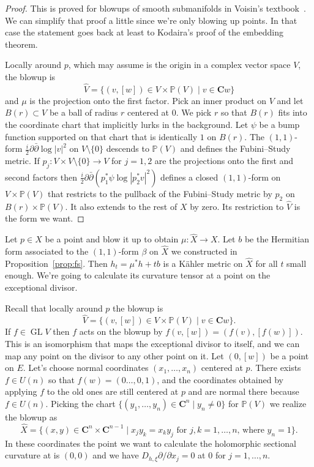 \documentclass[10pt,a4paper]{amsart}
\newcommand{\kk}[1]{\mathbb{#1}}
\def\CC{\mathbf{C}}
\def\fs{b}
\DeclareMathOperator{\GL}{GL}
\def\hsc{holomorphic sectional curvature}
\def\bl#1{\widehat{#1}}
\begin{document}
\begin{proof}
This is proved for blowups of smooth submanifolds in
Voisin's textbook~\cite{voisin2002theorie}.
We can simplify that proof a little since we're only blowing up points.
In that case the statement goes back at least to Kodaira's proof of the
embedding theorem.


Locally around $p$, which may assume is the origin in a complex vector space
$V$, the blowup is
$$
\bl V
= \{ (v,[w]) \in V \times \kk P(V) \mid v \in \CC w \}
$$
and $\mu$ is the projection onto the first factor.
Pick an inner product on $V$ and let $B(r) \subset V$ be a ball of radius $r$
centered at $0$.
We pick $r$ so that $B(r)$ fits into the coordinate chart that implicitly lurks
in the background.
Let $\psi$ be a bump function supported on that chart that is identically $1$
on $B(r)$.
The $(1,1)$-form $\frac i2 \partial\bar\partial \log |v|^2$ on $V \setminus
\{0\}$ descends to $\kk P(V)$ and defines the Fubini--Study metric.
If $p_j : V \times V \setminus \{0\} \to V$ for $j = 1,2$ are the projections
onto the first and second factors then
$\frac i2 \partial \bar\partial (p_1^*\psi \log |p_2^*v|^2)$
defines a closed $(1,1)$-form on $V \times \kk P(V)$ that restricts to the
pullback of the Fubini--Study metric by $p_2$ on $B(r) \times \kk P(V)$.
It also extends to the rest of $X$ by zero.
Its restriction to $\bl V$ is the form we want.
\end{proof}




Let $p \in X$ be a point and blow it up to obtain $\mu : \bl X \to X$.
Let $\fs$ be the Hermitian form associated to the $(1,1)$-form $\beta$ on $\bl X$
we constructed in Proposition~\ref{prop:fs}.
Then $h_t = \mu^*h + t \fs$ is a K\"ahler metric on $\bl X$ for all $t$ small
enough.
We're going to calculate its curvature tensor at a point on the exceptional
divisor.

Recall that locally around $p$ the blowup is
$$
\bl V
= \{ (v,[w]) \in V \times \kk P(V) \mid v \in \CC w \}.
$$
If $f \in \GL V$ then $f$ acts on the blowup by $f(v, [w]) = (f(v), [f(w)])$.
This is an isomorphism that maps the exceptional divisor to itself, and we can
map any point on the divisor to any other point on it.
Let $(0, [w])$ be a point on $E$.
Let's choose normal coordinates $(x_1,\ldots,x_n)$ centered at $p$.
There exists $f \in U(n)$ so that $f(w) = (0 \ldots, 0, 1)$, and the
coordinates obtained by applying $f$ to the old ones are still centered at $p$
and are normal there because $f \in U(n)$.
Picking the chart $\{(y_1, \ldots, y_n) \in \CC^n \mid y_n \not= 0 \}$ for
$\kk P(V)$
we realize the blowup as
$$
\bl X
= \{ (x,y) \in \CC^n \times \CC^{n-1}
\mid x_j y_k = x_k y_j \text{ for $j,k = 1,\ldots,n$, where $y_n = 1$}  \}.
$$
In these coordinates the point we want to calculate the \hsc{} at is $(0,0)$
and we have $D_{h,\xi} \partial / \partial x_j = 0$ at $0$ for $j = 1, \ldots, n$.
\end{document}
